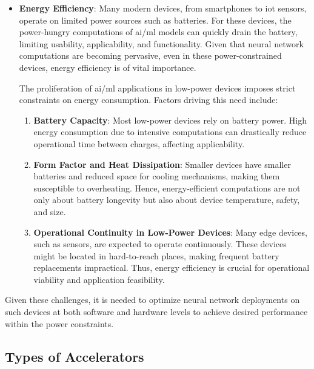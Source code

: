 \begin{itemize}
	\item \textbf{Energy Efficiency}: Many modern devices, from smartphones to \gls{iot} sensors, operate on limited power sources such as batteries. For these devices, the power-hungry computations of \gls{ai}/\gls{ml} models can quickly drain the battery, limiting usability, applicability, and functionality. Given that neural network computations are becoming pervasive, even in these power-constrained devices, energy efficiency is of vital importance.
	
	The proliferation of \gls{ai}/\gls{ml} applications in low-power devices imposes strict constraints on energy consumption. Factors driving this need include:
	
	\begin{enumerate}
		\item \textbf{Battery Capacity}: Most low-power devices rely on battery power. High energy consumption due to intensive computations can drastically reduce operational time between charges, affecting applicability.
		
		\item \textbf{Form Factor and Heat Dissipation}: Smaller devices have smaller batteries and reduced space for cooling mechanisms, making them susceptible to overheating. Hence, energy-efficient computations are not only about battery longevity but also about device temperature, safety, and size.
		
		\item \textbf{Operational Continuity in Low-Power Devices}: Many edge devices, such as sensors, are expected to operate continuously. These devices might be located in hard-to-reach places, making frequent battery replacements impractical. Thus, energy efficiency is crucial for operational viability and application feasibility.
	\end{enumerate}
	
\end{itemize}

Given these challenges, it is needed to optimize neural network deployments on such devices at both software and hardware levels to achieve desired performance within the power constraints.

\subsection{Types of Accelerators}

